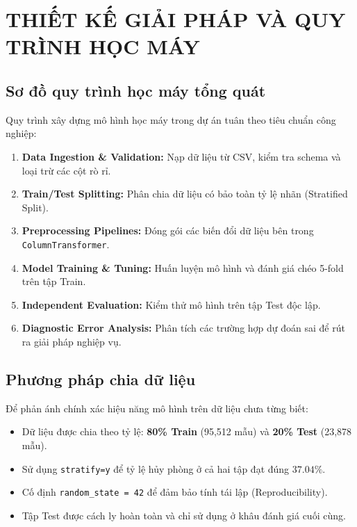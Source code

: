 \chapter{THIẾT KẾ GIẢI PHÁP VÀ QUY TRÌNH HỌC MÁY}

\section{Sơ đồ quy trình học máy tổng quát}
Quy trình xây dựng mô hình học máy trong dự án tuân theo tiêu chuẩn công nghiệp:
\begin{enumerate}
    \item \textbf{Data Ingestion \& Validation:} Nạp dữ liệu từ CSV, kiểm tra schema và loại trừ các cột rò rỉ.
    \item \textbf{Train/Test Splitting:} Phân chia dữ liệu có bảo toàn tỷ lệ nhãn (Stratified Split).
    \item \textbf{Preprocessing Pipelines:} Đóng gói các biến đổi dữ liệu bên trong \texttt{ColumnTransformer}.
    \item \textbf{Model Training \& Tuning:} Huấn luyện mô hình và đánh giá chéo 5-fold trên tập Train.
    \item \textbf{Independent Evaluation:} Kiểm thử mô hình trên tập Test độc lập.
    \item \textbf{Diagnostic Error Analysis:} Phân tích các trường hợp dự đoán sai để rút ra giải pháp nghiệp vụ.
\end{enumerate}

\section{Phương pháp chia dữ liệu}
Để phản ánh chính xác hiệu năng mô hình trên dữ liệu chưa từng biết:
\begin{itemize}
    \item Dữ liệu được chia theo tỷ lệ: \textbf{80\% Train} (95,512 mẫu) và \textbf{20\% Test} (23,878 mẫu).
    \item Sử dụng \texttt{stratify=y} để tỷ lệ hủy phòng ở cả hai tập đạt đúng $37.04\%$.
    \item Cố định \texttt{random\_state = 42} để đảm bảo tính tái lập (Reproducibility).
    \item Tập Test được cách ly hoàn toàn và chỉ sử dụng ở khâu đánh giá cuối cùng.
\end{itemize}


